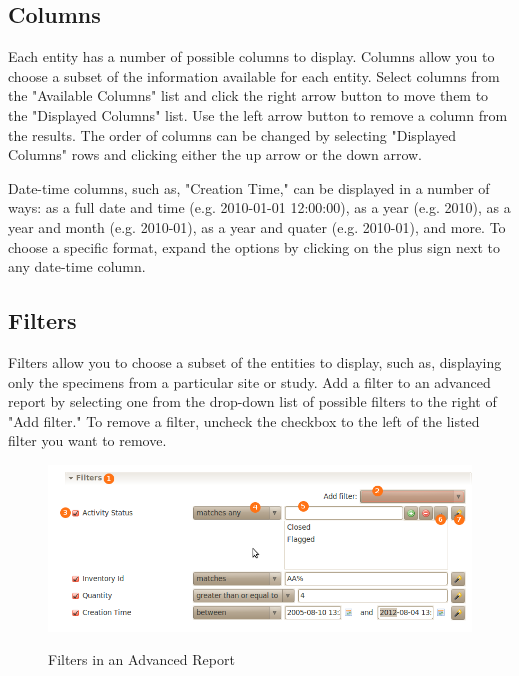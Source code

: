 \subsection{Columns}

Each entity has a number of possible columns to display. Columns allow you to choose a subset of the information available for each entity. Select columns from the "Available Columns" list and click the right arrow button to move them to the "Displayed Columns" list. Use the left arrow button to remove a column from the results. The order of columns can be changed by selecting "Displayed Columns" rows and clicking either the up arrow or the down arrow.

Date-time columns, such as, "Creation Time," can be displayed in a number of ways: as a full date and time (e.g. 2010-01-01 12:00:00), as a year (e.g. 2010), as a year and month (e.g. 2010-01), as a year and quater (e.g. 2010-01), and more. To choose a specific format, expand the options by clicking on the plus sign next to any date-time column.

\subsection{Filters}

Filters allow you to choose a subset of the entities to display, such as, displaying only the specimens from a particular site or study. Add a filter to an advanced report by selecting one from the drop-down list of possible filters to the right of "Add filter." To remove a filter, uncheck the checkbox to the left of the listed filter you want to remove.

\begin{figure}[H]
  \centering
  \scalebox{0.5}
	   { \includegraphics*{screenshots/advanced_reports/filters} }
	   \caption{Filters in an Advanced Report}
	   \label{fig:filters}
\end{figure}

